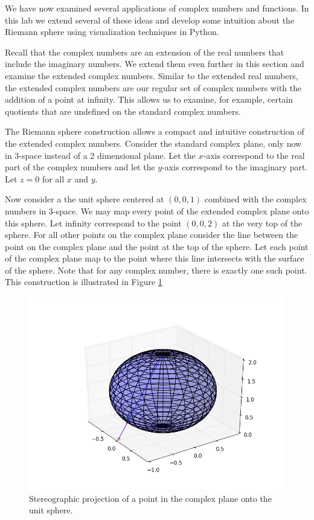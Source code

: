 

We have now examined several applications of complex numbers and functions.
In this lab we extend several of these ideas and develop some intuition about the Riemann sphere using visualization techniques in Python.

Recall that the complex numbers are an extension of the real numbers that include the imaginary numbers.
We extend them even further in this section and examine the extended complex numbers.
Similar to the extended real numbers, the extended complex numbers are our regular set of complex numbers with the addition of a point at infinity.
This allows us to examine, for example, certain quotients that are undefined on the standard complex numbers.

The Riemann sphere construction allows a compact and intuitive construction of the extended complex numbers.
Consider the standard complex plane, only now in 3-space instead of a 2 dimensional plane.
Let the $x$-axis correspond to the real part of the complex numbers and let the $y$-axis correspond to the imaginary part.
Let $z=0$ for all $x$ and $y$. 

Now consider a the unit sphere centered at $(0,0,1)$ combined with the complex numbers in 3-space.
We may map every point of the extended complex plane onto this sphere.
Let infinity correspond to the point $(0,0,2)$ at the very top of the sphere.
For all other points on the complex plane consider the line between the point on the complex plane and the point at the top of the sphere.
Let each point of the complex plane map to the point where this line intersects with the surface of the sphere.
Note that for any complex number, there is exactly one such point.
This construction is illustrated in Figure \ref{riemann:stereographic}

\begin{figure}
\includegraphics[width=\textwidth]{StereographicIllustration.png}
\caption{Stereographic projection of a point in the complex plane onto the unit sphere.}
\label{riemann:stereographic}
\end{figure}


